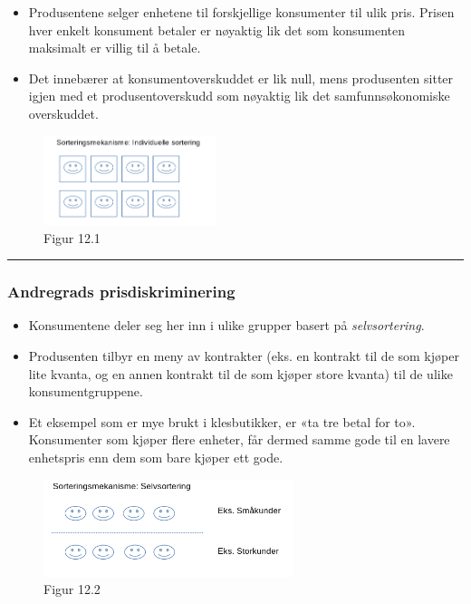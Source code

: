 \documentclass[
  letterpaper,
  DIV=11,
  numbers=noendperiod]{scrartcl}
\providecommand{\tightlist}{%
  \setlength{\itemsep}{0pt}\setlength{\parskip}{0pt}}\usepackage{longtable,booktabs,array}
\begin{document}
\begin{itemize}
\tightlist
\item
  Produsentene selger enhetene til forskjellige konsumenter til ulik
  pris. Prisen hver enkelt konsument betaler er nøyaktig lik det som
  konsumenten maksimalt er villig til å betale.
\item
  Det innebærer at konsumentoverskuddet er lik null, mens produsenten
  sitter igjen med et produsentoverskudd som nøyaktig lik det
  samfunnsøkonomiske overskuddet.
\end{itemize}

\begin{figure}[H]

{\centering \includegraphics[width=0.45\textwidth,height=\textheight]{drawio/1_grads.png}

}

\caption{Figur 12.1}

\end{figure}%

\begin{center}\rule{0.5\linewidth}{0.5pt}\end{center}

\subsubsection{Andregrads
prisdiskriminering}\label{andregrads-prisdiskriminering}

\begin{itemize}
\tightlist
\item
  Konsumentene deler seg her inn i ulike grupper basert på
  \emph{selvsortering}.
\item
  Produsenten tilbyr en meny av kontrakter (eks. en kontrakt til de som
  kjøper lite kvanta, og en annen kontrakt til de som kjøper store
  kvanta) til de ulike konsumentgruppene.
\item
  Et eksempel som er mye brukt i klesbutikker, er «ta tre betal for to».
  Konsumenter som kjøper flere enheter, får dermed samme gode til en
  lavere enhetspris enn dem som bare kjøper ett gode.
\end{itemize}

\begin{figure}[H]

{\centering \includegraphics[width=0.65\textwidth,height=\textheight]{drawio/2_grads.png}

}

\caption{Figur 12.2}

\end{figure}%
\end{document}
